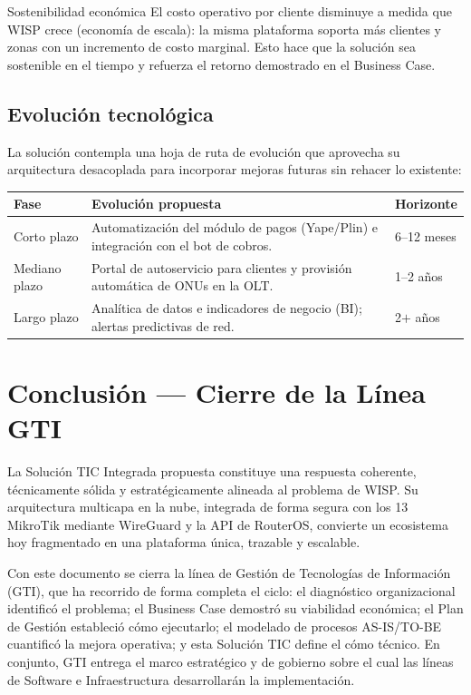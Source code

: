 \begin{upeubox}{Sostenibilidad económica}
El costo operativo por cliente disminuye a medida que WISP crece (economía de escala):
la misma plataforma soporta más clientes y zonas con un incremento de costo marginal.
Esto hace que la solución sea sostenible en el tiempo y refuerza el retorno demostrado
en el Business Case.
\end{upeubox}

\subsection{Evolución tecnológica}

La solución contempla una hoja de ruta de evolución que aprovecha su arquitectura
desacoplada para incorporar mejoras futuras sin rehacer lo existente:

\begin{center}
\label{tab:evolucion}
\begin{tabularx}{\textwidth}{L{2.8cm} X L{2.4cm}}
\toprule
\textbf{Fase} & \textbf{Evolución propuesta} & \textbf{Horizonte} \\
\midrule
Corto plazo &
Automatización del módulo de pagos (Yape/Plin) e integración con el bot de cobros. &
6--12 meses \\
Mediano plazo &
Portal de autoservicio para clientes y provisión automática de ONUs en la OLT. &
1--2 años \\
Largo plazo &
Analítica de datos e indicadores de negocio (BI); alertas predictivas de red. &
2$+$ años \\
\bottomrule
\end{tabularx}
\end{center}

\section{Conclusión — Cierre de la Línea GTI}
\label{sec:cierre-gti}

La Solución TIC Integrada propuesta constituye una respuesta coherente, técnicamente
sólida y estratégicamente alineada al problema de WISP. Su arquitectura multicapa en la
nube, integrada de forma segura con los 13 MikroTik mediante WireGuard y la API de
RouterOS, convierte un ecosistema hoy fragmentado en una plataforma única, trazable y
escalable.

Con este documento se cierra la línea de Gestión de Tecnologías de Información (GTI),
que ha recorrido de forma completa el ciclo: el diagnóstico organizacional identificó el
problema; el Business Case demostró su viabilidad económica; el Plan de Gestión
estableció cómo ejecutarlo; el modelado de procesos AS-IS/TO-BE cuantificó la mejora
operativa; y esta Solución TIC define el cómo técnico. En conjunto, GTI entrega el marco
estratégico y de gobierno sobre el cual las líneas de Software e Infraestructura
desarrollarán la implementación.

